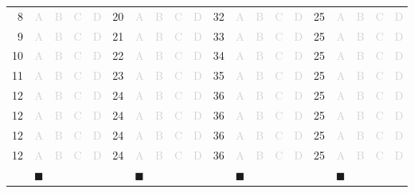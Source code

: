 \documentclass[a4paper,11pt]{article}
\newcommand{\light}[1]{\textcolor{lightgray}{#1}}
\begin{document}
\begin{center}
\begin{tabular}{r|c|c|c|c|r|c|c|c|c|r|c|c|c|c|r|c|c|c|c|}
\cline{2-5} \cline{7-10} \cline{12-15} \cline{17-20}
8& \light{A} & \light{B} & \light{C} & \light{D} & 20& \light{A} & \light{B} & \light{C} & \light{D} & 32& \light{A} & \light{B} & \light{C} & \light{D} & 25& \light{A} & \light{B} & \light{C} & \light{D}\\ 
\cline{2-5} \cline{7-10} \cline{12-15} \cline{17-20}
9& \light{A} & \light{B} & \light{C} & \light{D} & 21& \light{A} & \light{B} & \light{C} & \light{D} & 33& \light{A} & \light{B} & \light{C} & \light{D} & 25& \light{A} & \light{B} & \light{C} & \light{D}\\ 
\cline{2-5} \cline{7-10} \cline{12-15} \cline{17-20}
10& \light{A} & \light{B} & \light{C} & \light{D} & 22& \light{A} & \light{B} & \light{C} & \light{D} & 34& \light{A} & \light{B} & \light{C} & \light{D} & 25& \light{A} & \light{B} & \light{C} & \light{D}\\
\cline{2-5} \cline{7-10} \cline{12-15} \cline{17-20}
11& \light{A} & \light{B} & \light{C} & \light{D} & 23& \light{A} & \light{B} & \light{C} & \light{D} & 35& \light{A} & \light{B} & \light{C} & \light{D} & 25& \light{A} & \light{B} & \light{C} & \light{D}\\
\cline{2-5} \cline{7-10} \cline{12-15} \cline{17-20}
12& \light{A} & \light{B} & \light{C} & \light{D} & 24& \light{A} & \light{B} & \light{C} & \light{D} & 36& \light{A} & \light{B} & \light{C} & \light{D} & 25& \light{A} & \light{B} & \light{C} & \light{D}\\
\cline{2-5} \cline{7-10} \cline{12-15} \cline{17-20}
12& \light{A} & \light{B} & \light{C} & \light{D} & 24& \light{A} & \light{B} & \light{C} & \light{D} & 36& \light{A} & \light{B} & \light{C} & \light{D} & 25& \light{A} & \light{B} & \light{C} & \light{D}\\
\cline{2-5} \cline{7-10} \cline{12-15} \cline{17-20}
12& \light{A} & \light{B} & \light{C} & \light{D} & 24& \light{A} & \light{B} & \light{C} & \light{D} & 36& \light{A} & \light{B} & \light{C} & \light{D} & 25& \light{A} & \light{B} & \light{C} & \light{D}\\
\cline{2-5} \cline{7-10} \cline{12-15} \cline{17-20}
12& \light{A} & \light{B} & \light{C} & \light{D} & 24& \light{A} & \light{B} & \light{C} & \light{D} & 36& \light{A} & \light{B} & \light{C} & \light{D} & 25& \light{A} & \light{B} & \light{C} & \light{D}\\
\cline{2-5} \cline{7-10} \cline{12-15} \cline{17-20}
\multicolumn{1}{c}{} & \multicolumn{1}{c}{$\blacksquare$} & \multicolumn{1}{c}{} & \multicolumn{1}{c}{} & \multicolumn{1}{c}{} & \multicolumn{1}{c}{} & \multicolumn{1}{c}{$\blacksquare$} & \multicolumn{1}{c}{} & \multicolumn{1}{c}{} & \multicolumn{1}{c}{} & \multicolumn{1}{c}{} & \multicolumn{1}{c}{$\blacksquare$} & \multicolumn{1}{c}{} & \multicolumn{1}{c}{} & \multicolumn{1}{c}{} & \multicolumn{1}{c}{} & \multicolumn{1}{c}{$\blacksquare$} & \multicolumn{1}{c}{} & \multicolumn{1}{c}{} & \multicolumn{1}{c}{}\\ 

\end{tabular}
\end{center}
\end{document}

